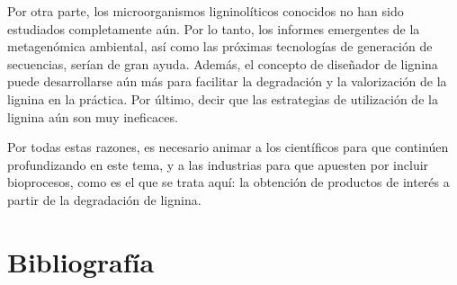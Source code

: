 \documentclass[final,a4paper,times,3p,onecolumn]{elsarticle}
\begin{document}
Por otra parte, los microorganismos ligninolíticos conocidos no han sido estudiados completamente aún. Por lo tanto, los informes emergentes de la metagenómica ambiental, así como las próximas tecnologías de generación de secuencias, serían de gran ayuda. Además, el concepto de diseñador de lignina puede desarrollarse aún más para facilitar la degradación y la valorización de la lignina en la práctica. Por último, decir que las estrategias de utilización de la lignina aún son muy ineficaces. 

Por todas estas razones, es necesario animar a los científicos para que continúen profundizando en este tema, y a las industrias para que apuesten por incluir bioprocesos, como es el que se trata aquí: la obtención de productos de interés a partir de la degradación de lignina.
\section{Bibliografía}
 

\end{document}
